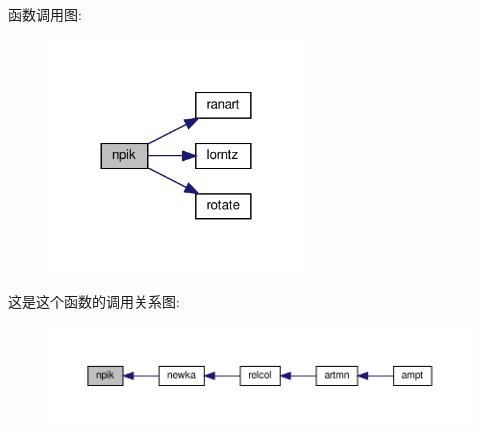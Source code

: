 函数调用图\+:
\nopagebreak
\begin{figure}[H]
\begin{center}
\leavevmode
\includegraphics[width=192pt]{npik_8f90_af82cf952da4a981ac64b0998ef1aa8ae_cgraph}
\end{center}
\end{figure}
这是这个函数的调用关系图\+:
\nopagebreak
\begin{figure}[H]
\begin{center}
\leavevmode
\includegraphics[width=350pt]{npik_8f90_af82cf952da4a981ac64b0998ef1aa8ae_icgraph}
\end{center}
\end{figure}
